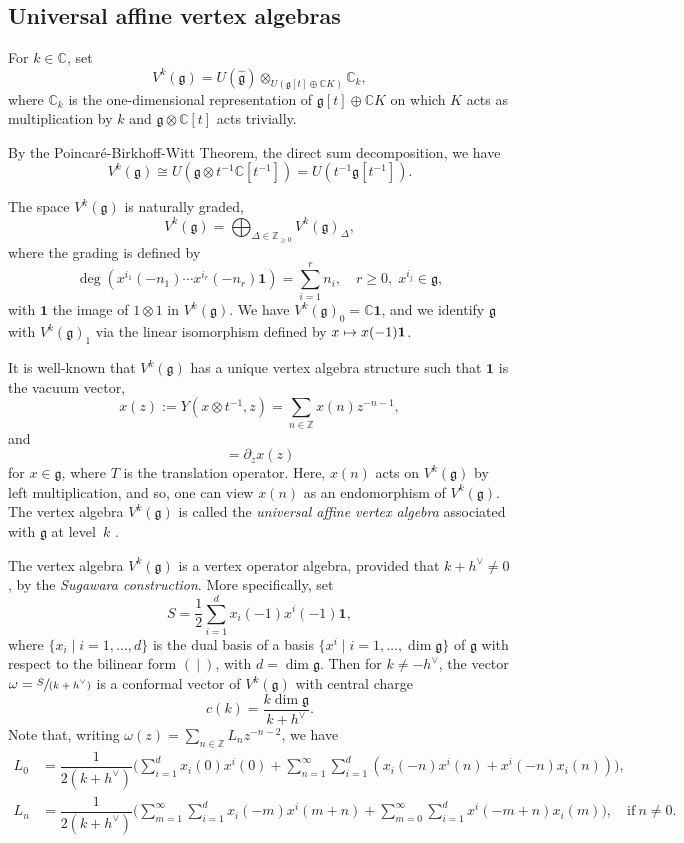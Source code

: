 \documentclass[JEP,XML,SOM,Unicode]{cedram}
\let\oldvee\vee
\renewcommand{\vee}{{\scriptscriptstyle\oldvee}}
\newcommand\mto{\mathchoice{\longmapsto}{\mapsto}{\mapsto}{\mapsto}}
\newcommand{\spfrac}[2]{\sfrac{#1}{(#2)}}
\newcommand\C{{\mathbb C}}
\newcommand\Z{{\mathbb Z}}
\newcommand \g{\mathfrak g}
\newcommand \frg{\widehat{\mathfrak{g}}}
\theoremstyle{definition}
\begin{document}
\subsection{Universal affine vertex algebras}
\label{sec:Universal affine vertex algebras}
For $k \in \C$, set
\begin{equation*}
V^k(\g)=U(\frg)\otimes _{U(\g [t]\oplus \C K)}\C_k,
\end{equation*}
where $\C_k$ is the one-dimensional representation of $\g [t]\oplus \C K$
on which $K$ acts as multiplication by $k$ and $\g\otimes \C[t]$ acts trivially.

By the Poincaré-Birkhoff-Witt Theorem, the direct sum decomposition,
we have
\begin{equation}
V^k(\g)\cong U(\g \otimes t^{-1}\C[t^{-1}]) = U(t^{-1} \g[t^{-1}]).
\label{eq:PBW}
\end{equation}

The space $V^k(\g)$ is naturally graded,
\begin{equation*}
V^k(\g) =\bigoplus_{\Delta\in \Z_{\geq 0}}V^k(\g) _{\Delta},
\end{equation*}
where the grading is defined by
\[
\deg (x^{i_1}(-n_1)\cdots x^{i_r}(-n_r) \mathbf{1}) = \sum_{i=1}^r n_i,
\quad r \geq 0, \; x^{i_j} \in \g,
\]
with $\mathbf{1}$ the image of $1\otimes 1$ in $V^k(\g)$.
We have $V^k(\g)_0=\C\mathbf{1} $,
and we identify $\g$ with $V^k(\g)_1$ via the linear isomorphism
defined by $x\mto x(-1)\mathbf{1} $.

It is well-known that $V^k(\g)$ has a unique vertex algebra structure
such that $\mathbf{1}$ is the vacuum vector,
\[
x(z) := Y(x\otimes t^{-1},z) =\sum_{n \in \Z} x(n) z^{-n-1},
\]
and
\begin{equation*}
[T,x(z)]=\partial_z x(z)
\end{equation*}
for $x \in \g$,
where $T$ is the translation operator.
Here, $x(n)$ acts on $V^k(\g)$ by left multiplication, and
so, one can view $x(n)$ as an endomorphism of $V^k(\g)$.
The vertex algebra
$V^k(\g)$ is called the \emph{universal affine vertex algebra}
associated with $\g$ at level~$k$ \cite{FZ,Zhu96,LL}.

The vertex algebra
$V^k(\g)$ is a vertex operator algebra, provided that $k+h^\vee\not=0$,
by the \emph{Sugawara construction}.
More specifically, set
\[
S=\displaystyle{\frac{1}{2}} \sum_{i=1}^{d}
x_{i}(-1) x^{i}(-1) \mathbf{1},
\]
where $\{x_{i}\mid i=1,\dots,d\}$ is the dual
basis of a basis $\{x^{i}\mid i=1,\dots,\dim \g\}$ of $\g$
with respect to the bilinear form $(~|~)$, with $d = \dim \g$.
Then for $k \not=-h^\vee$, the vector
$\omega=\displaystyle{\spfrac{S}{k+h^\vee}}$
is a conformal vector of $V^k(\g)$ with central charge
\[
c(k)=\displaystyle{\frac{k \dim \g}{k+h^\vee}}.
\]
Note that, writing $\omega(z) = \sum_{n \in \Z} L_n z^{-n-2}$,
we have
\begin{align*}
L_0&= \dfrac{1}{2(k+h^\vee)}
\biggl(\sum_{i=1}^{d}x_i(0)x^i(0)+\sum_{n=1}^{\infty}\sum_{i=1}^{d}(x_i(-n)x^i(n)+x^i(-n)x_i(n)) \biggr),\\
L_n&=\dfrac{1}{2(k+h^\vee)}
\biggl(\sum_{m=1}^{\infty}\sum_{i=1}^{d}x_i(-m)x^i(m+n)
+\sum_{m=0}^{\infty}\sum_{i=1}^{d}x^i(-m+n)x_i(m)\biggr), \quad
\text{if} \ n\!\neq\! 0.
\end{align*}
\end{document}
